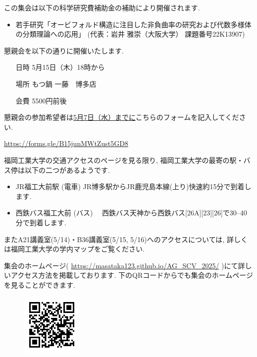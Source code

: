\documentclass[dvipdfmx,a4paper,12pt]{article}
\theoremstyle{plain} %
\theoremstyle{definition} %
\begin{document}
  
  

この集会は以下の科学研究費補助金の補助により開催されます.
\begin{itemize}
  \setlength{\parskip}{0cm} 
  \setlength{\itemsep}{0cm}
\item 若手研究「オービフォルド構造に注目した非負曲率の研究および代数多様体の分類理論への応用」
 (代表：岩井 雅崇（大阪大学） 課題番号22K13907)
  \end{itemize}

\vskip5mm

懇親会を以下の通りに開催いたします.
\begin{itemize}
  \setlength{\parskip}{0cm} 
  \setlength{\itemsep}{0cm}
\item[日時] 5月15日（木）18時から
\item[場所] もつ鍋 一藤　博多店
\item[会費] 5500円前後 
  \end{itemize}
  
懇親会の参加希望者は\underline{5月7日（水）までに}こちらのフォームを記入してください.
\begin{center}
  \url{https://forms.gle/B15junMWtZust5GD8}
  \end{center}

\vskip5mm

福岡工業大学の交通アクセスのページを見る限り, 福岡工業大学の最寄の駅・バス停は以下の二つがあるようです.
\begin{itemize}
  \setlength{\parskip}{0cm} 
  \setlength{\itemsep}{0cm}
\item JR福工大前駅 (電車) JR博多駅からJR鹿児島本線(上り)快速約15分で到着します.
\item 西鉄バス福工大前 (バス) 　西鉄バス天神から西鉄バス[26A][23][26]で30--40分で到着します.
\end{itemize}

またA21講義室(5/14)・B36講義室(5/15, 5/16)へのアクセスについては, 詳しくは福岡工業大学の学内マップをご覧ください. 

集会のホームページ( \url{https://masataka123.github.io/AG_SCV_2025/} )にて詳しいアクセス方法を掲載しております. 下のQRコードからでも集会のホームページを見ることができます. 

\begin{figure}[htbp]
\begin{center}
 \includegraphics[height=30mm, width=30mm]{2025AGSCV.png}
\end{center}
\end{figure}
\end{document}
